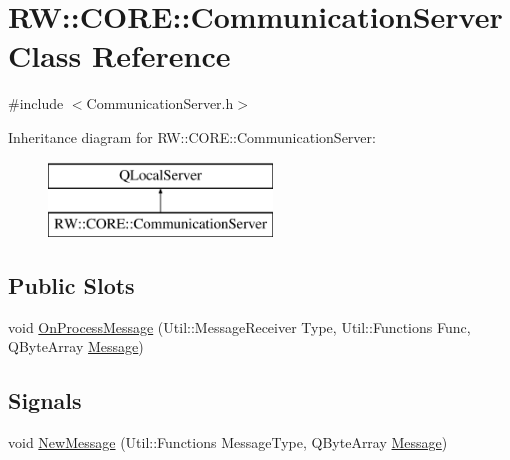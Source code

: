 \hypertarget{class_r_w_1_1_c_o_r_e_1_1_communication_server}{}\section{RW\+:\+:C\+O\+RE\+:\+:Communication\+Server Class Reference}
\label{class_r_w_1_1_c_o_r_e_1_1_communication_server}


{\ttfamily \#include $<$Communication\+Server.\+h$>$}

Inheritance diagram for RW\+:\+:C\+O\+RE\+:\+:Communication\+Server\+:\begin{figure}[H]
\begin{center}
\leavevmode
\includegraphics[height=2.000000cm]{class_r_w_1_1_c_o_r_e_1_1_communication_server}
\end{center}
\end{figure}
\subsection*{Public Slots}
\begin{DoxyCompactItemize}
\item 
void \hyperlink{class_r_w_1_1_c_o_r_e_1_1_communication_server_a623ab8380a69de4f849c284e808b30c0}{On\+Process\+Message} (Util\+::\+Message\+Receiver Type, Util\+::\+Functions Func, Q\+Byte\+Array \hyperlink{namespace_r_w_1_1_c_o_r_e_a571834b44d0e3fab58aa6abfe5a02988}{Message})
\end{DoxyCompactItemize}
\subsection*{Signals}
\begin{DoxyCompactItemize}
\item 
void \hyperlink{class_r_w_1_1_c_o_r_e_1_1_communication_server_a44354b19e6c0aad3f462904978b671a3}{New\+Message} (Util\+::\+Functions Message\+Type, Q\+Byte\+Array \hyperlink{namespace_r_w_1_1_c_o_r_e_a571834b44d0e3fab58aa6abfe5a02988}{Message})
\end{DoxyCompactItemize}
